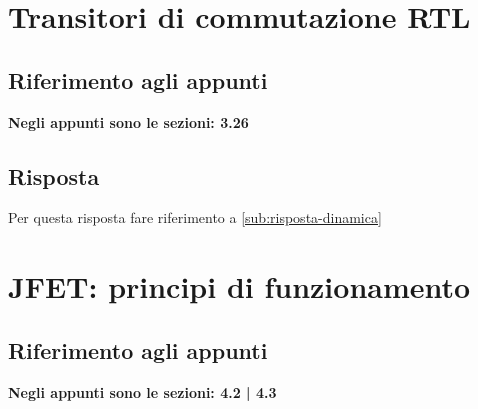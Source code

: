 \documentclass{article}
\numberwithin{equation}{subsection}
\begin{document}
	\section{Transitori di commutazione RTL}
	\subsection{Riferimento agli appunti}
	\textbf{Negli appunti sono le sezioni: 3.26}
	\subsection{Risposta}
	Per questa risposta fare riferimento a \ref{sub:risposta-dinamica}
	\section{JFET: principi di funzionamento}
	\subsection{Riferimento agli appunti}
	\textbf{Negli appunti sono le sezioni: 4.2 | 4.3 }
\end{document}
